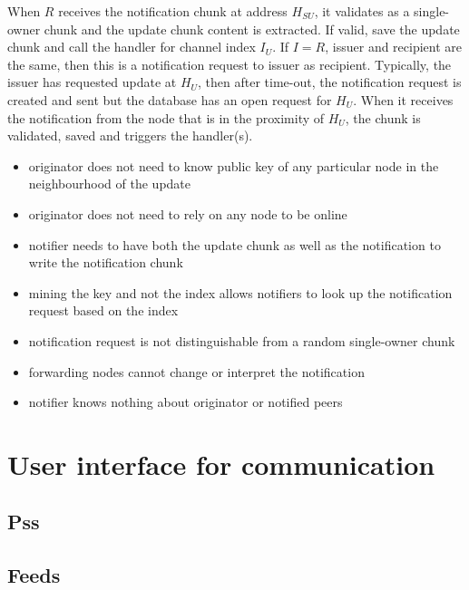 When $R$ receives the notification chunk at address $H_{SU}$, it validates as a single-owner chunk and the update chunk content is extracted. If valid, save the update chunk and call the handler for channel index $I_U$.
If $I=R$, issuer and recipient are the same, then this is a notification request to issuer as recipient.
Typically, the issuer has requested update at $H_U$, then after time-out, the notification request is created and sent but the database has an open request for $H_U$. When it receives the notification from the node that is in the proximity of $H_U$, the chunk is validated, saved and triggers the handler(s).

\begin{itemize}
    \item originator does not need to know public key of any particular node in the neighbourhood of the update
    \item originator does not need to rely on any node to be online
    \item notifier needs to have both the update chunk as well as the notification to write the notification chunk
    \item mining the key and not the index allows notifiers to look up the notification request based on the index 
    \item notification request is not distinguishable from a random single-owner chunk
    \item forwarding nodes cannot change or interpret the notification 
    \item notifier knows nothing about originator or notified peers
\end{itemize}




\section{User interface for communication}

\subsection{Pss}\label{sec:pss-ux}
\subsection{Feeds}\label{sec:feeds-ux}
